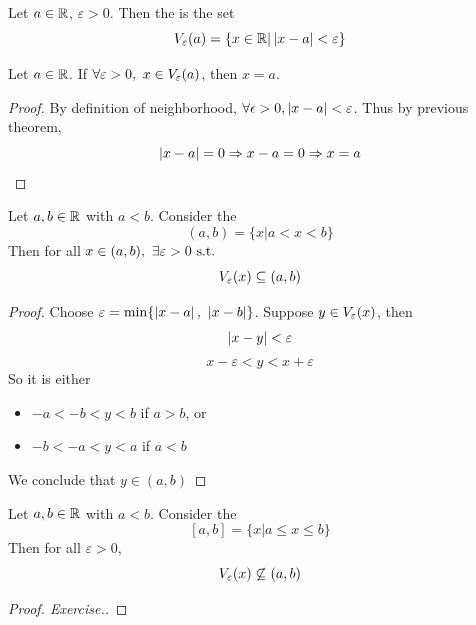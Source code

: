 \documentclass[a4paper,12pt]{article}
\begin{document}
\begin{definition}
    Let \(a\in\mathbb{R}\), \(\varepsilon>0\). Then the  is the set 
    \[V_{\varepsilon}{(a)}=\{x\in\mathbb{R}|\left\lvert x-a\right\rvert<\varepsilon\}\]
    \begin{center}
    \end{center}
\end{definition}

\begin{theorem}
    Let \(a\in\mathbb{R}\). If \(\forall \varepsilon>0,\ x\in\neighbor{\varepsilon}{a}\), then \(x=a\). 
    \begin{proof}
        By definition of neighborhood, \(\forall \epsilon>0, \left\lvert x-a\right\rvert<\varepsilon\). Thus by previous theorem,
        \[\left\lvert x-a\right\rvert=0\Rightarrow x-a=0\Rightarrow x=a\]
    \end{proof}
\end{theorem}

\begin{proposition}
    Let \(a,b\in\mathbb{R}\) with \(a<b\). Consider the  
    \[(a,b)=\{x|a<x<b\}\]
    Then for all \(x\in(a,b),\ \exists\varepsilon>0\st\)
    \[V_{\varepsilon}{(x)}\subseteq(a,b)\]
    \begin{proof}
        Choose \(\varepsilon=\min\{\left\lvert x-a\right\rvert,\ \left\lvert x-b\right\rvert\}\). Suppose \(y\in V_{\varepsilon}{(x)}\), then 
        \[\left\lvert x-y\right\rvert<\varepsilon\]
        \[x-\varepsilon<y<x+\varepsilon\]
        So it is either 
        \begin{itemize}
            \item \(-a<-b<y<b\) if \(a>b\), or 
            \item \(-b<-a<y<a\) if \(a<b\)
        \end{itemize}
        We conclude that \(y\in(a,b)\)
    \end{proof}
\end{proposition}

\newpage

\begin{proposition}
    Let \(a,b\in\mathbb{R}\) with \(a<b\). Consider the  
    \[[a,b]=\{x|a\le x\le b\}\]
    Then for all \(\varepsilon>0\),
    \[V_{\varepsilon}{(x)}\not\subseteq(a,b)\]
    \begin{proof}[Proof. Exercise.]
        
    \end{proof}
\end{proposition}
\end{document}
